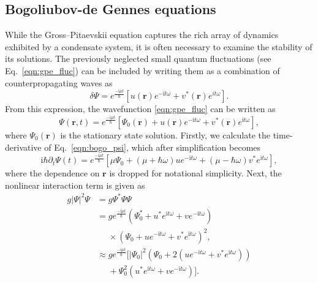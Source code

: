 \subsection{Bogoliubov-de Gennes equations}
\label{sec:bogo}
While the Gross--Pitaevskii equation captures the rich array of dynamics exhibited by a condensate system, it is often necessary to examine the stability of its solutions. The previously neglected small quantum fluctuations (see Eq.~\eqref{eqn:gpe_fluc}) can be included by writing them as a combination of counterpropagating waves as
\begin{equation}
    \delta\hat{\Psi} = e^{\frac{-\textrm{i}\mu t}{\hbar}}[u(\mathbf{r})e^{-\textrm{i}t\omega} + v^{*}(\mathbf{r})e^{it\omega}].
\end{equation}
From this expression, the wavefunction \eqref{eqn:gpe_fluc} can be written as
\begin{equation}\label{eqn:bogo_psi}
\Psi(\mathbf{r},t) = e^{\frac{-\textrm{i}\mu t}{\hbar}}\left[\Psi_0(\mathbf{r}) + u(\mathbf{r})e^{-\textrm{i}t\omega} + v^{*}(\mathbf{r})e^{\textrm{i}t\omega} \right],
\end{equation}
where $\Psi_0(\mathbf{r})$ is the stationary state solution. Firstly, we calculate the time-derivative of Eq.~\eqref{eqn:bogo_psi}, which after simplification becomes
\begin{equation}\label{eqn:bogo_lhs}
    \textrm{i}\hbar\partial_t \Psi(t) = e^{\frac{-\textrm{i}\mu t}{\hbar}}\left[\mu\Psi_0 + (\mu+\hbar\omega)ue^{-\textrm{i}t\omega} + (\mu-\hbar\omega)v^{*}e^{\textrm{i}t\omega} \right],
\end{equation}
where the dependence on $\mathbf{r}$ is dropped for notational simplicity. Next, the nonlinear interaction term is given as
\begin{subequations}
\begin{align}\label{eqn:bogo_nonlin}
    g|\Psi|^2\Psi &= g\Psi^{*}\Psi\Psi \\
    &= g e^{\frac{-\textrm{i}\mu t}{\hbar}}(\Psi_0^{*} + u^{*}e^{\textrm{i}t\omega} + ve^{-\textrm{i}t\omega})\\ &~~~~~~\times (\Psi_0 + u e^{-\textrm{i}t\omega} + v^{*} e^{\textrm{i}t\omega})^2, \nonumber \\
    & \approx g e^{\frac{-\textrm{i}\mu t}{\hbar}}[|\Psi_0|^2(\Psi_0 + 2(u e^{-\textrm{i}t\omega} + v^{*} e^{\textrm{i}t\omega} )) \\ &~~~~~~+ \Psi_0^2( u^{*} e^{\textrm{i}t\omega} + v e^{-\textrm{i}t\omega})]. \nonumber
\end{align}
\end{subequations}
